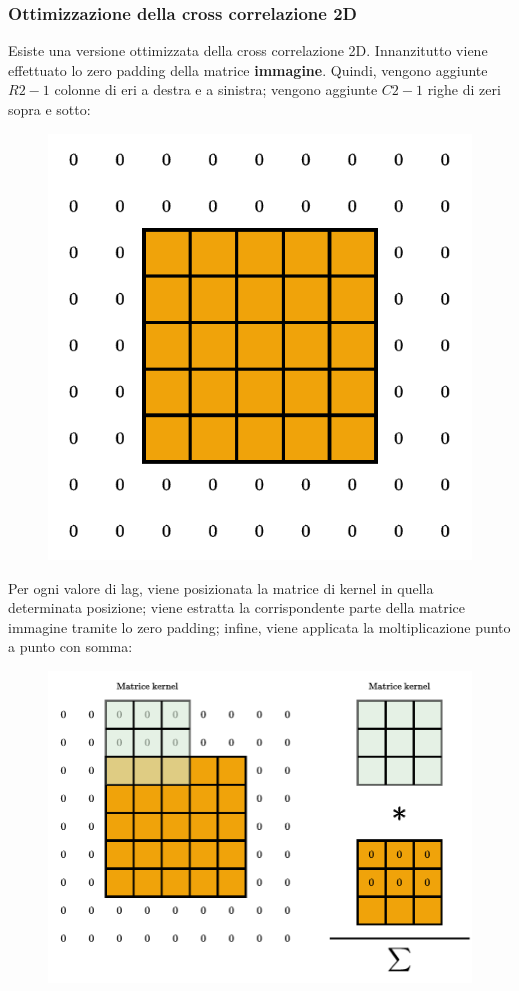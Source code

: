 \documentclass[a4paper]{article}
\begin{document}
	\subsubsection{Ottimizzazione della cross correlazione 2D}
	
	Esiste una versione ottimizzata della cross correlazione 2D. Innanzitutto viene effettuato lo zero padding della matrice \textbf{immagine}. Quindi, vengono aggiunte $R2-1$ colonne di eri a destra e a sinistra; vengono aggiunte $C2-1$ righe di zeri sopra e sotto:
	\begin{figure}[!htp]
		\centering
		\includegraphics[width=.6\textwidth]{img/lab/cross-correlazione2D-3.pdf}
	\end{figure}
	
	\noindent
	Per ogni valore di lag, viene posizionata la matrice di kernel in quella determinata posizione; viene estratta la corrispondente parte della matrice immagine tramite lo zero padding; infine, viene applicata la moltiplicazione punto a punto con somma:
	\begin{figure}[!htp]
		\centering
		\includegraphics[width=.8\textwidth]{img/lab/cross-correlazione2D-4.pdf}
	\end{figure}
	
\end{document}
